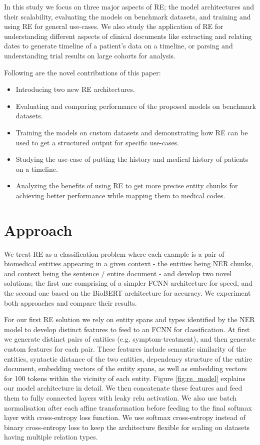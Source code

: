 \documentclass[letterpaper]{article}
\begin{document}
In this study we focus on three major aspects of RE; the model architectures and their scalability, evaluating the models on benchmark datasets, and training and using RE for general use-cases. We also study the application of RE for understanding different aspects of clinical documents like extracting and relating dates to generate timeline of a patient's data on a timeline, or parsing and understanding trial results on large cohorts for analysis. 

Following are the novel contributions of this paper:
\begin{itemize}
\item Introducing two new RE architectures.
\item Evaluating and comparing performance of the proposed models on benchmark datasets.
\item Training the models on custom datasets and demonstrating how RE can be used to get a structured output for specific use-cases.
\item Studying the use-case of putting the history and medical history of patients on a timeline.
\item Analyzing the benefits of using RE to get more precise entity chunks for achieving better performance while mapping them to medical codes.
\end{itemize}

\section{Approach}

We treat RE as a classification problem where each example is a pair of biomedical entities appearing in a given context - the entities being NER chunks, and context being the sentence / entire document - and develop two novel solutions; the first one comprising of a simpler FCNN architecture for speed, and the second one based on the BioBERT \cite{DBLP:journals/corr/abs-1901-08746} architecture for accuracy. We experiment both approaches and compare their results.

For our first RE solution we rely on entity spans and types identified by the NER model to develop distinct features to feed to an FCNN for classification. At first we generate distinct pairs of entities (e.g. symptom-treatment), and then generate custom features for each pair. These features include semantic similarity of the entities, syntactic distance of the two entities, dependency structure of the entire document, embedding vectors of the entity spans, as well as embedding vectors for 100 tokens within the vicinity of each entity. Figure \ref{fig:re_model} explains our model architecture in detail. We then concatenate these features and feed them to fully connected layers with leaky relu activation. We also use batch normalisation after each affine transformation before feeding to the final softmax layer with cross-entropy loss function. We use softmax cross-entropy instead of binary cross-entropy loss to keep the architecture flexible for scaling on datasets having multiple relation types.
\end{document}
